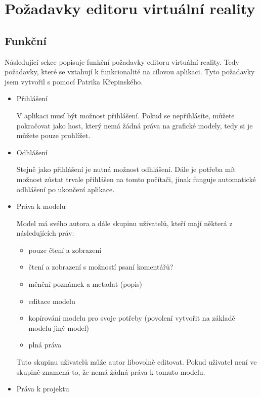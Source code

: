 \documentclass[thesis=B,czech]{FITthesis}[2012/06/26]
\begin{document}
    \section{Požadavky editoru virtuální reality}
        \subsection{Funkční}
        \label{sec:analFP}
            Následující sekce popisuje funkční požadavky editoru virtuální reality. Tedy požadavky, které se vztahují k funkcionalitě na cílovou aplikaci. Tyto požadavky jsem vytvořil s pomocí Patrika Křepinského.
            \begin{itemize}
                \item Přihlášení
                
                V aplikaci musí být možnost přihlášení. Pokud se nepřihlásíte, můžete pokračovat jako host, který nemá žádná práva na grafické modely, tedy si je můžete pouze prohlížet.
                \item Odhlášení
                
                Stejně jako přihlášení je nutná možnost odhlášení. Dále je potřeba mít možnost zůstat trvale přihlášen na tomto počítači, jinak funguje automatické odhlášení po ukončení aplikace.
               \item Práva k modelu
               
                Model má svého autora a dále skupinu uživatelů, kteří mají některá z následujících práv:
                \begin{itemize}
                    \item pouze čtení a zobrazení
                    \item čtení a zobrazení s možností psaní komentářů?
                    \item měnění poznámek a metadat (popis)
                    \item editace modelu
                    \item kopírování modelu pro svoje potřeby (povolení vytvořit na základě modelu jiný model)
                    \item plná práva
                \end{itemize}
                Tuto skupinu uživatelů může autor libovolně editovat. Pokud uživatel není ve skupině znamená to, že nemá žádná práva k tomuto modelu.
               \item Práva k projektu
               

\end{itemize}
\end{document}
